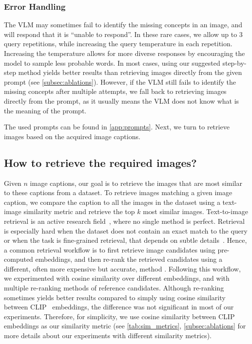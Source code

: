 \vspace{-4pt}
\subsubsection{Error Handling}
\label{subsec:err_hand}

The VLM may sometimes fail to identify the missing concepts in an image, and will respond that it is ``unable to respond''. In these rare cases, we allow up to 3 query repetitions, while increasing the query temperature in each repetition. Increasing the temperature allows for more diverse responses by encouraging the model to sample less probable words.
In most cases, using our suggested step-by-step method yields better results than retrieving images directly from the given prompt (see 
\cref{subsec:ablations}).
However, if the VLM still fails to identify the missing concepts after multiple attempts, we fall back to retrieving images directly from the prompt, as it usually means the VLM does not know what is the meaning of the prompt.

The used prompts can be found in \cref{app:prompts}.
Next, we turn to retrieve images based on the acquired image captions.

\vspace{-3pt}
\subsection{How to retrieve the required images?}

Given $n$ image captions, our goal is to retrieve the images that are most similar to these captions from a dataset. 
To retrieve images matching a given image caption, we compare the caption to all the images in the dataset using a text-image similarity metric and retrieve the top $k$ most similar images.
Text-to-image retrieval is an active research field~\cite{radford2021learning, zhai2023sigmoid, ray2024cola, vendrowinquire}, where no single method is perfect.
Retrieval is especially hard when the dataset does not contain an exact match to the query \cite{biswas2024efficient} or when the task is fine-grained retrieval, that depends on subtle details~\cite{wei2022fine}.
Hence, a common retrieval workflow is to first retrieve image candidates using pre-computed embeddings, and then re-rank the retrieved candidates using a different, often more expensive but accurate, method \cite{vendrowinquire}.
Following this workflow, we experimented with cosine similarity over different embeddings, and with multiple re-ranking methods of reference candidates.
Although re-ranking sometimes yields better results compared to simply using cosine similarity between CLIP~\cite{radford2021learning} embeddings, the difference was not significant in most of our experiments. Therefore, for simplicity, we use cosine similarity between CLIP embeddings as our similarity metric (see \cref{tab:sim_metrics}, \cref{subsec:ablations} for more details about our experiments with different similarity metrics).

